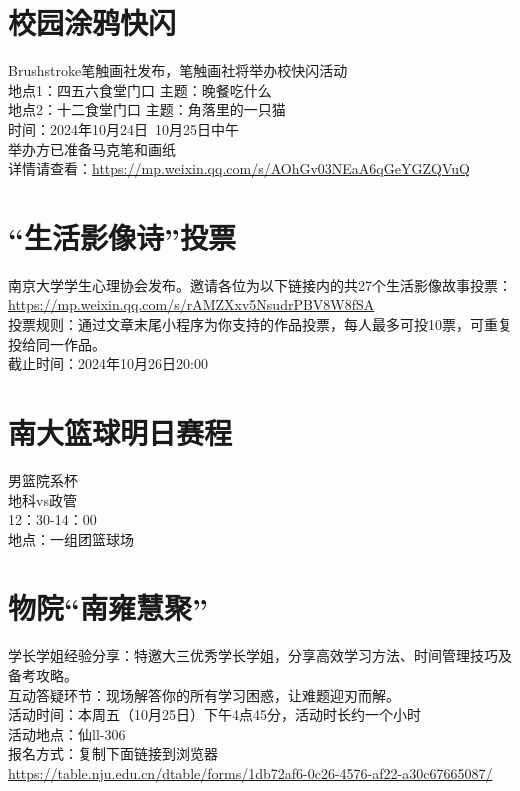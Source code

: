 \documentclass[letterpaper, 12pt]{article}
\begin{document}
\begin{multicols}{2}
{\section{校园涂鸦快闪}
Brushstroke笔触画社发布，笔触画社将举办校快闪活动\\
地点1：四五六食堂门口    主题：晚餐吃什么\\
地点2：十二食堂门口      主题：角落里的一只猫\\
时间：2024年10月24日~10月25日中午\\
举办方已准备马克笔和画纸\\
详情请查看：\url{https://mp.weixin.qq.com/s/AOhGv03NEaA6qGeYGZQVuQ}\\




\section{“生活影像诗”投票}
南京大学学生心理协会发布。邀请各位为以下链接内的共27个生活影像故事投票：\\
\url{https://mp.weixin.qq.com/s/rAMZXxv5NsudrPBV8W8fSA}\\
投票规则：通过文章末尾小程序为你支持的作品投票，每人最多可投10票，可重复投给同一作品。\\
截止时间：2024年10月26日20:00\\
\section{南大篮球明日赛程}
男篮院系杯\\
地科vs政管\\
12：30-14：00\\
地点：一组团篮球场\\
\section{物院“南雍慧聚”}
学长学姐经验分享：特邀大三优秀学长学姐，分享高效学习方法、时间管理技巧及备考攻略。\\
互动答疑环节：现场解答你的所有学习困惑，让难题迎刃而解。\\
活动时间：本周五（10月25日）下午4点45分，活动时长约一个小时\\
活动地点：仙ll-306\\
报名方式：复制下面链接到浏览器\url{https://table.nju.edu.cn/dtable/forms/1db72af6-0c26-4576-af22-a30c67665087/}


}
\end{multicols}
\end{document}
